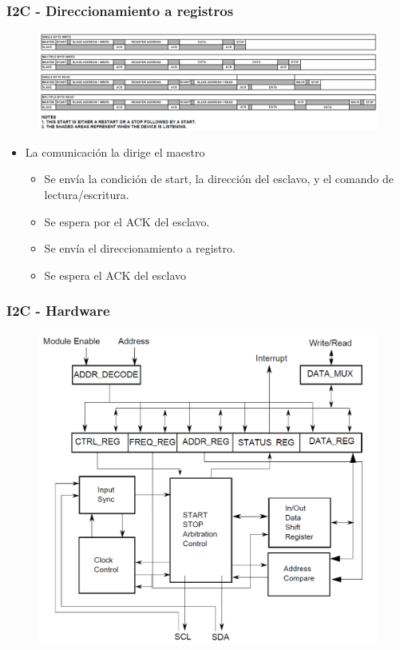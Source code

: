 \documentclass[10.5pt,scale=1.0,t,aspectratio=169,hyperref={pdfpagelabels=false}]{beamer}
\begin{document}
\begin{frame}
{\begin{columns}
	\end{columns}	
	}
\end{frame}

\begin{frame}
	\frametitle{I2C - Direccionamiento a registros}
	{\small
		\begin{figure}
			\centering
			\includegraphics[scale=0.23]{25_I2CProtocol}
		\end{figure}
		
		\begin{itemize}
			\item La comunicación la dirige el maestro
			\begin{itemize}
				\item Se envía la condición de start, la dirección del esclavo, y el comando de lectura/escritura. 
				\item Se espera por el ACK del esclavo.
				\item Se envía el direccionamiento a registro. 
				\item Se espera el ACK del esclavo
			\end{itemize}
		\end{itemize}	
	}
\end{frame}
\begin{frame}
	\frametitle{I2C - Hardware}
	{\small
		\begin{figure}
			\centering
			\includegraphics[scale=0.4]{26_I2CHardware}
		\end{figure}
	}
\end{frame}
\end{document}
